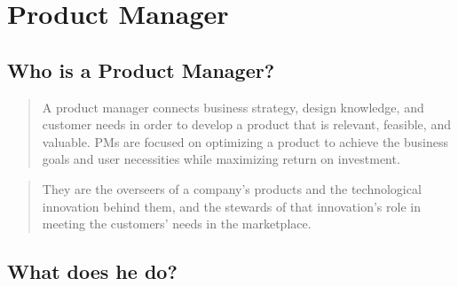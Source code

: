 \documentclass[
]{book}
\begin{document}
\hypertarget{product-manager}{%
\chapter*{Product Manager}\label{product-manager}}

\hypertarget{who-is-a-product-manager}{%
\section*{Who is a Product Manager?}\label{who-is-a-product-manager}}

\begin{quote}
A product manager connects business strategy, design knowledge, and customer needs in order to develop a product that is relevant, feasible, and valuable. PMs are focused on optimizing a product to achieve the business goals and user necessities while maximizing return on investment.
\end{quote}

\begin{quote}
They are the overseers of a company's products and the technological innovation behind them, and the stewards of that innovation's role in meeting the customers' needs in the marketplace.
\end{quote}

\hypertarget{what-does-he-do-1}{%
\section*{What does he do?}\label{what-does-he-do-1}}
\end{document}
